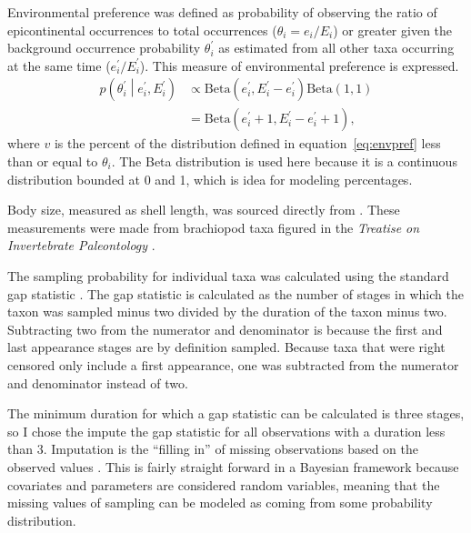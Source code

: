 \documentclass[11pt]{article}
\begin{document}
Environmental preference was defined as probability of observing the ratio of epicontinental occurrences to total occurrences (\(\theta_{i} = e_{i} / E_{i}\)) or greater given the background occurrence probability \(\theta^{\prime}_{i}\) as estimated from all other taxa occurring at the same time (\(e^{\prime}_{i} / E^{\prime}_{i}\)). This measure of environmental preference is expressed.
\begin{equation}
  \begin{aligned}
    p\left(\theta^{\prime}_{i} \middle| e^{\prime}_{i}, E^{\prime}_{i} \right) &\propto \mathrm{Beta}(e^{\prime}_{i}, E^{\prime}_{i} - e^{\prime}_{i}) \mathrm{Beta}(1, 1) \\
    &= \mathrm{Beta}(e^{\prime}_{i} + 1, E^{\prime}_{i} - e^{\prime}_{i} + 1),
  \end{aligned}
  \label{eq:envpref}
\end{equation}
where \(v\) is the percent of the distribution defined in equation~\ref{eq:envpref} less than or equal to \(\theta_{i}\). The Beta distribution is used here because it is a continuous distribution bounded at 0 and 1, which is idea for modeling percentages.

Body size, measured as shell length, was sourced directly from \citet{Payne2014}. These measurements were made from brachiopod taxa figured in the \textit{Treatise on Invertebrate Paleontology} \citep{Brunton2007}.

The sampling probability for individual taxa was calculated using the standard gap statistic \citep{Foote1996e,Foote2000}. The gap statistic is calculated as the number of stages in which the taxon was sampled minus two divided by the duration of the taxon minus two. Subtracting two from the numerator and denominator is because the first and last appearance stages are by definition sampled. Because taxa that were right censored only include a first appearance, one was subtracted from the numerator and denominator instead of two.

The minimum duration for which a gap statistic can be calculated is three stages, so I chose the impute the gap statistic for all observations with a duration less than 3. Imputation is the ``filling in'' of missing observations based on the observed values \citep{Rubin1996,Gelman2007}. This is fairly straight forward in a Bayesian framework because covariates and parameters are considered random variables, meaning that the missing values of sampling can be modeled as coming from some probability distribution. 
\end{document}
